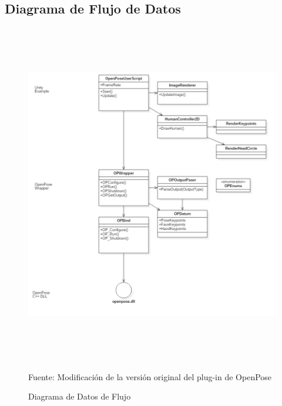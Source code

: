 \newpage
\subsection{Diagrama de Flujo de Datos}


\begin{figure}[h]
\centering
\includegraphics[width=14cm,height=15cm,]{./Images/futurediagramaderequisitos.png}
\caption{Diagrama de Datos de Flujo}
\footnotesize Fuente: Modificación de la versión original del plug-in de OpenPose\cite{8765346}
\label{dfd}
\end{figure}


